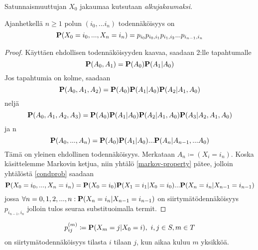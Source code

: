 \begin{maar}\label{markov-maar-c}
	
\end{maar}

\begin{maar}
	Satunnaismuuttujan $X_0$ jakaumaa kutsutaan \textit{alkujakaumaksi}. 
\end{maar}

\begin{lause}
	Ajanhetkellä $n\geq 1$ polun $(i_0,...i_n)$ todennäköisyys on 
	\begin{equation}
		\textbf{P} (X_0=i_0,...,X_n=i_n) = p_{i_0} p_{i_0,i_1} p_{i_1,i_2} ... p_{i_{n-1},i_n}
	\end{equation} 
\end{lause}
\begin{proof}
	Käyttäen ehdollisen todennäköisyyden kaavaa, saadaan 2:lle tapahtumalle
	\begin{equation*}
		\textbf{P} (A_0, A_1)=\textbf{P}(A_0)\textbf{P}(A_1|A_0)
	\end{equation*}
	Jos tapahtumia on kolme, saadaan
	\begin{equation*}
		\textbf{P} (A_0, A_1, A_2)=\textbf{P}(A_0)\textbf{P}(A_1|A_0)\textbf{P}(A_2|A_1, A_0)
	\end{equation*}
	neljä
	\begin{equation*}
		\textbf{P} (A_0, A_1, A_2, A_3)=\textbf{P}(A_0)\textbf{P}(A_1|A_0)\textbf{P}(A_2|A_1, A_0)\textbf{P}(A_3|A_2,A_1,A_0)
	\end{equation*}
	ja n
	\begin{equation}\label{condprob}
		\textbf{P} (A_0,...,A_n)=\textbf{P}(A_0)\textbf{P}(A_1|A_0)...\textbf{P}(A_n|A_{n-1},...A_0)
	\end{equation}
	Tämä on yleinen ehdollinen todennäköisyys. Merkataan $A_n \coloneqq (X_i=i_n)$. Koska käsittelemme Markovin ketjua, niin yhtälö \ref{markov-property} pätee, jolloin yhtälöstä \ref{condprob} saadaan 
	\begin{equation*}
		\textbf{P}(X_0=i_0,...,X_n=i_n) = \textbf{P}(X_0=i_0) \textbf{P}(X_1=i_1|X_0=i_0)...\textbf{P}(X_n=i_n|X_{n-1}=i_{n-1})
	\end{equation*}
	jossa $\forall n=0,1,2,...,n: \textbf{P}(X_n=i_n|X_{n-1}=i_{n-1})$ on siirtymätödennäköisyys $p_{i_{n-1},i_n}$ jolloin tulos seuraa substituoimalla termit.
\end{proof}

\begin{merk}
	\begin{equation}
		p_{ij}^{(m)} \coloneqq \textbf{P} (X_m=j|X_0=i),\ i,j\in S,m\in T
	\end{equation}
	on siirtymätodennäköisyys tilasta $i$ tilaan $j$, kun aikaa kuluu $m$ yksikköä.
\end{merk}

